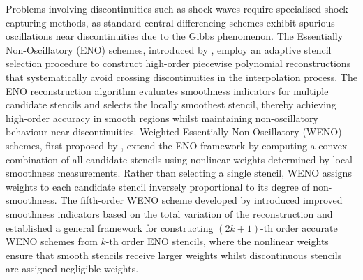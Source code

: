 Problems involving discontinuities such as shock waves require specialised shock capturing methods, as standard central differencing schemes exhibit spurious oscillations near discontinuities due to the Gibbs phenomenon. The Essentially Non-Oscillatory (ENO) schemes, introduced by \citet{HartenEtAl1987}, employ an adaptive stencil selection procedure to construct high-order piecewise polynomial reconstructions that systematically avoid crossing discontinuities in the interpolation process. The ENO reconstruction algorithm evaluates smoothness indicators for multiple candidate stencils and selects the locally smoothest stencil, thereby achieving high-order accuracy in smooth regions whilst maintaining non-oscillatory behaviour near discontinuities. Weighted Essentially Non-Oscillatory (WENO) schemes, first proposed by \citet{LiuEtAl1994}, extend the ENO framework by computing a convex combination of all candidate stencils using nonlinear weights determined by local smoothness measurements. Rather than selecting a single stencil, WENO assigns weights to each candidate stencil inversely proportional to its degree of non-smoothness. The fifth-order WENO scheme developed by \citet{JiangShu1996} introduced improved smoothness indicators based on the total variation of the reconstruction and established a general framework for constructing $(2k+1)$-th order accurate WENO schemes from $k$-th order ENO stencils, where the nonlinear weights ensure that smooth stencils receive larger weights whilst discontinuous stencils are assigned negligible weights. 






